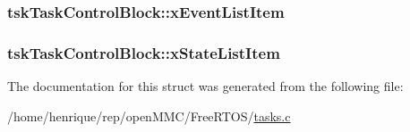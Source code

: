 \hypertarget{structtskTaskControlBlock_a1a1612b6081a13683808284d93a9b28f}{
\subsubsection[{x\-Event\-List\-Item}]{ tsk\-Task\-Control\-Block\-::x\-Event\-List\-Item}}\label{structtskTaskControlBlock_a1a1612b6081a13683808284d93a9b28f}
\hypertarget{structtskTaskControlBlock_a16e0d20425d53ac78537e1fdb8834cf6}{
\subsubsection[{x\-State\-List\-Item}]{ tsk\-Task\-Control\-Block\-::x\-State\-List\-Item}}\label{structtskTaskControlBlock_a16e0d20425d53ac78537e1fdb8834cf6}


The documentation for this struct was generated from the following file\-:\begin{DoxyCompactItemize}
\item 
/home/henrique/rep/open\-M\-M\-C/\-Free\-R\-T\-O\-S/\hyperlink{tasks_8c}{tasks.\-c}\end{DoxyCompactItemize}
